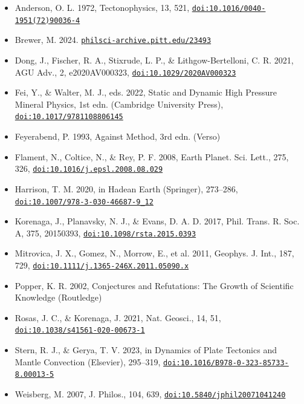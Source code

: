 \documentclass[11pt]{article}
\begin{document}
\begin{itemize}

\item Anderson, O. L. 1972, Tectonophysics, 13, 521, \href{https://doi.org/10.1016/0040-1951(72)90036-4}{\nolinkurl{doi:10.1016/0040-1951(72)90036-4}}

\item Brewer, M. 2024. \href{https://philsci-archive.pitt.edu/23493/}{\nolinkurl{philsci-archive.pitt.edu/23493}}

\item Dong, J., Fischer, R. A., Stixrude, L. P., \& Lithgow-Bertelloni, C. R. 2021, AGU Adv., 2, e2020AV000323, \href{https://doi.org/10.1029/2020AV000323}{\nolinkurl{doi:10.1029/2020AV000323}}

\item Fei, Y., \& Walter, M. J., eds. 2022, Static and Dynamic High Pressure Mineral Physics, 1st edn. (Cambridge University Press), \href{https://doi.org/10.1017/9781108806145}{\nolinkurl{doi:10.1017/9781108806145}}

\item Feyerabend, P. 1993, Against Method, 3rd edn. (Verso)

\item Flament, N., Coltice, N., \& Rey, P. F. 2008, Earth Planet. Sci. Lett., 275, 326, \href{https://doi.org/10.1016/j.epsl.2008.08.029}{\nolinkurl{doi:10.1016/j.epsl.2008.08.029}}

\item Harrison, T. M. 2020, in Hadean Earth (Springer), 273--286, \href{https://doi.org/10.1007/978-3-030-46687-9_12}{\nolinkurl{doi:10.1007/978-3-030-46687-9_12}}

\item Korenaga, J., Planavsky, N. J., \& Evans, D. A. D. 2017, Phil. Trans. R. Soc. A, 375, 20150393, \href{https://doi.org/10.1098/rsta.2015.0393}{\nolinkurl{doi:10.1098/rsta.2015.0393}}

\item Mitrovica, J. X., Gomez, N., Morrow, E., et al. 2011, Geophys. J. Int., 187, 729, \href{https://doi.org/10.1111/j.1365-246X.2011.05090.x}{\nolinkurl{doi:10.1111/j.1365-246X.2011.05090.x}}

\item Popper, K. R. 2002, Conjectures and Refutations: The Growth of Scientific Knowledge (Routledge)

\item Rosas, J. C., \& Korenaga, J. 2021, Nat. Geosci., 14, 51, \href{https://doi.org/10.1038/s41561-020-00673-1}{\nolinkurl{doi:10.1038/s41561-020-00673-1}}

\item Stern, R. J., \& Gerya, T. V. 2023, in Dynamics of Plate Tectonics and Mantle Convection (Elsevier), 295--319, \href{https://doi.org/10.1016/B978-0-323-85733-8.00013-5}{\nolinkurl{doi:10.1016/B978-0-323-85733-8.00013-5}}

\item Weisberg, M. 2007, J. Philos., 104, 639, \href{https://doi.org/10.5840/jphil20071041240}{\nolinkurl{doi:10.5840/jphil20071041240}}

\end{itemize}
\end{document}
